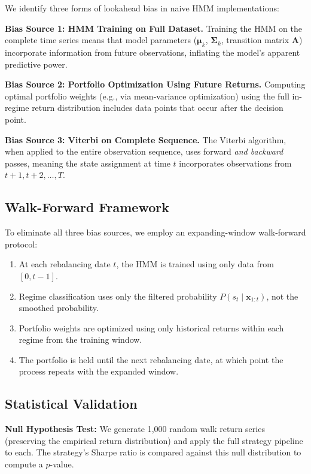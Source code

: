 \documentclass[11pt]{article}
\begin{document}
We identify three forms of lookahead bias in naive HMM implementations:

\textbf{Bias Source 1: HMM Training on Full Dataset.} Training the HMM on the complete time series means that model parameters ($\boldsymbol{\mu}_k$, $\boldsymbol{\Sigma}_k$, transition matrix $\mathbf{A}$) incorporate information from future observations, inflating the model's apparent predictive power.

\textbf{Bias Source 2: Portfolio Optimization Using Future Returns.} Computing optimal portfolio weights (e.g., via mean-variance optimization) using the full in-regime return distribution includes data points that occur after the decision point.

\textbf{Bias Source 3: Viterbi on Complete Sequence.} The Viterbi algorithm, when applied to the entire observation sequence, uses forward \emph{and backward} passes, meaning the state assignment at time $t$ incorporates observations from $t+1, t+2, \ldots, T$.

\subsection{Walk-Forward Framework}

To eliminate all three bias sources, we employ an expanding-window walk-forward protocol:

\begin{enumerate}[nosep]
    \item At each rebalancing date $t$, the HMM is trained using only data from $[0, t-1]$.
    \item Regime classification uses only the filtered probability $P(s_t \mid \mathbf{x}_{1:t})$, not the smoothed probability.
    \item Portfolio weights are optimized using only historical returns within each regime from the training window.
    \item The portfolio is held until the next rebalancing date, at which point the process repeats with the expanded window.
\end{enumerate}

\subsection{Statistical Validation}

\textbf{Null Hypothesis Test:} We generate 1,000 random walk return series (preserving the empirical return distribution) and apply the full strategy pipeline to each. The strategy's Sharpe ratio is compared against this null distribution to compute a $p$-value.
\end{document}
